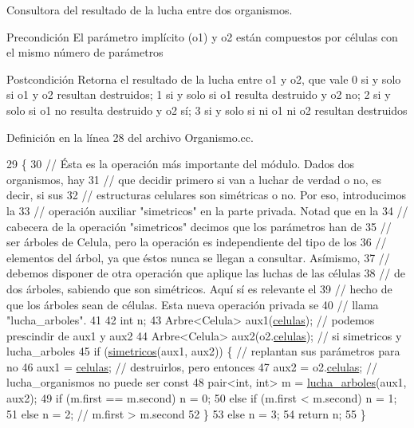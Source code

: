 Consultora del resultado de la lucha entre dos organismos. 

\begin{DoxyPrecond}{Precondición}
El parámetro implícito (o1) y o2 están compuestos por células con el mismo número de parámetros 
\end{DoxyPrecond}
\begin{DoxyPostcond}{Postcondición}
Retorna el resultado de la lucha entre o1 y o2, que vale 0 si y solo si o1 y o2 resultan destruidos; 1 si y solo si o1 resulta destruido y o2 no; 2 si y solo si o1 no resulta destruido y o2 sí; 3 si y solo si ni o1 ni o2 resultan destruidos 
\end{DoxyPostcond}


Definición en la línea 28 del archivo Organismo.\+cc.


\begin{DoxyCode}
29 \{
30   \textcolor{comment}{// Ésta es la operación más importante del módulo. Dados dos organismos, hay}
31   \textcolor{comment}{// que decidir primero si van a luchar de verdad o no, es decir, si sus}
32   \textcolor{comment}{// estructuras celulares son simétricas o no. Por eso, introducimos la}
33   \textcolor{comment}{// operación auxiliar "simetricos" en la parte privada.  Notad que en la}
34   \textcolor{comment}{// cabecera de la operación "simetricos" decimos que los parámetros han de}
35   \textcolor{comment}{// ser árboles de Celula, pero la operación es independiente del tipo de los}
36   \textcolor{comment}{// elementos del árbol, ya que éstos nunca se llegan a consultar.  Asímismo,}
37   \textcolor{comment}{// debemos disponer de otra operación que aplique las luchas de las células}
38   \textcolor{comment}{// de dos árboles, sabiendo que son simétricos. Aquí sí es relevante el}
39   \textcolor{comment}{// hecho de que los árboles sean de células. Esta nueva operación privada se}
40   \textcolor{comment}{// llama "lucha\_arboles".}
41 
42   \textcolor{keywordtype}{int} n;
43   Arbre<Celula> aux1(\hyperlink{class_organismo_abfafb8e55144e295b406ce90951f0c68}{celulas});       \textcolor{comment}{// podemos prescindir de aux1 y aux2}
44   Arbre<Celula> aux2(o2.\hyperlink{class_organismo_abfafb8e55144e295b406ce90951f0c68}{celulas});    \textcolor{comment}{// si simetricos y lucha\_arboles}
45   \textcolor{keywordflow}{if} (\hyperlink{class_organismo_ac483b268b68eed06f612ed690c22af8f}{simetricos}(aux1, aux2)) \{      \textcolor{comment}{// replantan sus parámetros para no}
46     aux1 = \hyperlink{class_organismo_abfafb8e55144e295b406ce90951f0c68}{celulas};                  \textcolor{comment}{// destruirlos, pero entonces }
47     aux2 = o2.\hyperlink{class_organismo_abfafb8e55144e295b406ce90951f0c68}{celulas};               \textcolor{comment}{// lucha\_organismos no puede ser const}
48     pair<int, int> m = \hyperlink{class_organismo_aaf643a47840f855ed3e105970f75a078}{lucha\_arboles}(aux1, aux2);
49     \textcolor{keywordflow}{if} (m.first == m.second) n = 0;
50     \textcolor{keywordflow}{else} \textcolor{keywordflow}{if} (m.first < m.second) n = 1;
51     \textcolor{keywordflow}{else} n = 2; \textcolor{comment}{// m.first > m.second}
52   \}
53   \textcolor{keywordflow}{else} n = 3;
54   \textcolor{keywordflow}{return} n;
55 \}
\end{DoxyCode}

